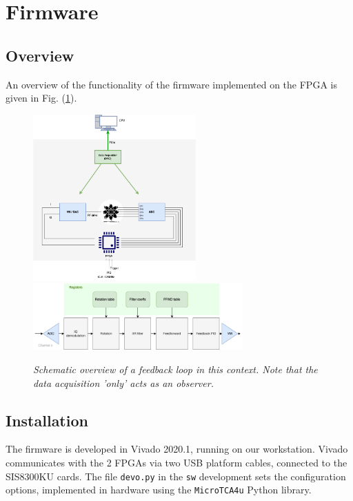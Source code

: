\documentclass[12pt]{amsart}
\begin{document}
\newpage
{}
\section{Firmware}

\subsection{Overview}

An overview of the functionality of the firmware implemented on the FPGA is given in Fig. (\ref{fig:func}).
\begin{figure}[htbp] %
   \centering
   \includegraphics[height=2.5in]{im/loop2023.png} 
   \includegraphics[height=1in]{im/firmware.png} 
   \caption{\em Schematic overview of a feedback loop in this context.
   	Note that the data acquisition 'only' acts as an observer.}
   \label{fig:func}
\end{figure}


\subsection{Installation}

The firmware is developed in Vivado 2020.1, running on our workstation.
Vivado communicates with the 2 FPGAs via two USB platform cables, connected to the SIS8300KU cards.
The file \verb|devo.py| in the \verb|sw| development sets the configuration options, implemented in hardware using the \verb|MicroTCA4u| Python library.
\end{document}
